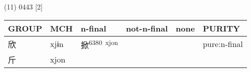 \documentclass[14pt,a4paper]{scrartcl}
\begin{document}
(11) 0443 {[}2{]}

\begin{longtable}[c]{@{}llllll@{}}
\toprule
\begin{minipage}[b]{0.14\columnwidth}\raggedright\strut
GROUP
\strut\end{minipage} &
\begin{minipage}[b]{0.14\columnwidth}\raggedright\strut
MCH
\strut\end{minipage} &
\begin{minipage}[b]{0.14\columnwidth}\raggedright\strut
n-final
\strut\end{minipage} &
\begin{minipage}[b]{0.14\columnwidth}\raggedright\strut
not-n-final
\strut\end{minipage} &
\begin{minipage}[b]{0.14\columnwidth}\raggedright\strut
none
\strut\end{minipage} &
\begin{minipage}[b]{0.14\columnwidth}\raggedright\strut
PURITY
\strut\end{minipage}\tabularnewline
\midrule
\endhead
\begin{minipage}[t]{0.14\columnwidth}\raggedright\strut
欣
\strut\end{minipage} &
\begin{minipage}[t]{0.14\columnwidth}\raggedright\strut
xjɨn
\strut\end{minipage} &
\begin{minipage}[t]{0.14\columnwidth}\raggedright\strut
掀\textsuperscript{6380~xjon}
\strut\end{minipage} &
\begin{minipage}[t]{0.14\columnwidth}\raggedright\strut
\strut\end{minipage} &
\begin{minipage}[t]{0.14\columnwidth}\raggedright\strut
\strut\end{minipage} &
\begin{minipage}[t]{0.14\columnwidth}\raggedright\strut
pure:n-final
\strut\end{minipage}\tabularnewline
\begin{minipage}[t]{0.14\columnwidth}\raggedright\strut
斤
\strut\end{minipage} &
\begin{minipage}[t]{0.14\columnwidth}\raggedright\strut
xjon
\strut\end{minipage} &
\begin{minipage}[t]{0.14\columnwidth}\raggedright\strut

\end{minipage}
\end{longtable}
\end{document}
